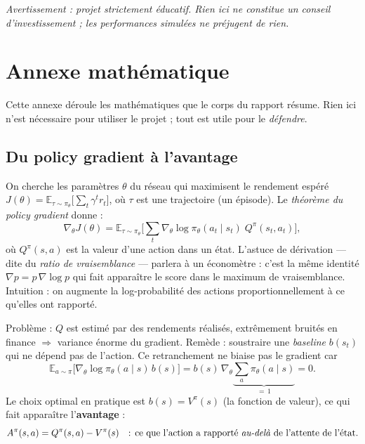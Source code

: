 \documentclass[11pt,a4paper]{article}
\begin{document}
\vspace{8pt}
\noindent\textit{Avertissement : projet strictement éducatif. Rien ici ne constitue un
conseil d'investissement ; les performances simulées ne préjugent de rien.}

\appendix
\section{Annexe mathématique}
\label{app:maths}

Cette annexe déroule les mathématiques que le corps du rapport résume. Rien ici n'est
nécessaire pour utiliser le projet ; tout est utile pour le \emph{défendre}.

\subsection{Du policy gradient à l'avantage}
\label{app:pg}

On cherche les paramètres $\theta$ du réseau qui maximisent le rendement espéré
$J(\theta) = \mathbb{E}_{\tau \sim \pi_\theta}\big[\sum_t \gamma^t r_t\big]$, où $\tau$
est une trajectoire (un épisode). Le \emph{théorème du policy gradient} donne :
\[
\nabla_\theta J(\theta)
= \mathbb{E}_{\tau \sim \pi_\theta}\Big[\sum_t \nabla_\theta \log \pi_\theta(a_t \mid s_t)\; Q^{\pi}(s_t, a_t)\Big],
\]
où $Q^\pi(s,a)$ est la valeur d'une action dans un état. L'astuce de dérivation --- dite
du \emph{ratio de vraisemblance} --- parlera à un économètre : c'est la même identité
$\nabla p = p \, \nabla \log p$ qui fait apparaître le score dans le maximum de
vraisemblance. Intuition : on augmente la log-probabilité des actions proportionnellement
à ce qu'elles ont rapporté.

Problème : $Q$ est estimé par des rendements réalisés, extrêmement bruités en finance
$\Rightarrow$ variance énorme du gradient. Remède : soustraire une \emph{baseline}
$b(s_t)$ qui ne dépend pas de l'action. Ce retranchement ne biaise pas le gradient car
\[
\mathbb{E}_{a \sim \pi}\big[\nabla_\theta \log \pi_\theta(a \mid s)\, b(s)\big]
= b(s)\, \nabla_\theta \underbrace{\sum_a \pi_\theta(a \mid s)}_{=\,1} = 0 .
\]
Le choix optimal en pratique est $b(s) = V^\pi(s)$ (la fonction de valeur), ce qui fait
apparaître l'\textbf{avantage} :
\[
A^\pi(s, a) = Q^\pi(s, a) - V^\pi(s)
\quad \text{: ce que l'action a rapporté \emph{au-delà} de l'attente de l'état.}
\]
\end{document}
